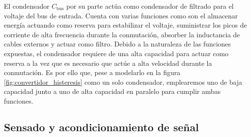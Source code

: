 \documentclass[12pt]{report} %
\begin{document}
El condensador $C_\text{bus}$ por su parte actúa como condensador de filtrado para el voltaje del bus de entrada. Cuenta con varias funciones como son el almacenar energía actuando como reserva para estabilizar el voltaje, suministrar los picos de corriente de alta frecuencia durante la conmutación, absorber la inductancia de cables externos y actuar como filtro. Debido a la naturaleza de las funciones expuestas, el condensador requiere de una alta capacidad para actuar como reserva a la vez que es necesario que actúe a alta velocidad durante la conmutación. Es por ello que, pese a modelarlo en la figura \ref{fig:convertidor_histeresis} como un solo condensador, emplearemos uno de baja capacidad junto a uno de alta capacidad en paralelo para cumplir ambas funciones. 

\subsection{Sensado y acondicionamiento de señal}
\end{document}
